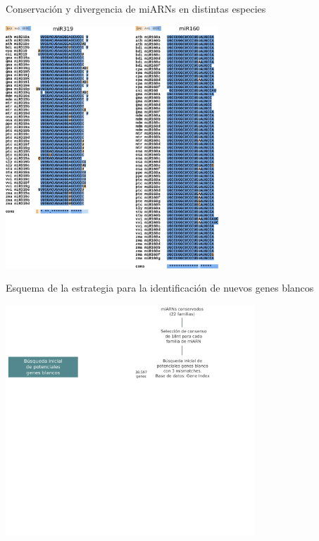 \documentclass{beamer}
\begin{document}
\begin{frame}{Conservación y divergencia de miARNs en distintas especies}
	\begin{center}
		\includegraphics[width=0.6\textwidth]{img/variabilidad_maduro.png}
	\end{center}
\end{frame}

\begin{frame}{Esquema de la estrategia para la identificación de nuevos genes blancos}
	\begin{center}
		\includegraphics[width=0.7\textwidth]{img/NAR_fig01_01.png}
	\end{center}
\end{frame}
\end{document}

